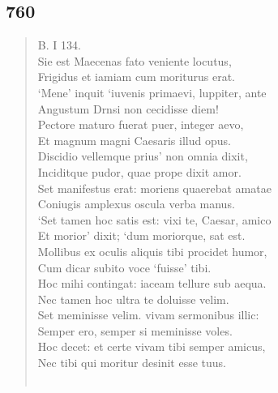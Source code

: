 \documentclass[11pt, a4paper]{report}
\begin{document}
            \subsection*{760}
      \begin{verse}
      B. I 134. \\ Sie est Maecenas fato veniente locutus, \\ Frigidus et iamiam cum moriturus erat. \\ ‘Mene’ inquit ‘iuvenis primaevi, luppiter, ante \\ Angustum Drnsi non cecidisse diem! \\ Pectore maturo fuerat puer, integer aevo, \\ Et magnum magni Caesaris illud opus. \\ Discidio vellemque prius’ non omnia dixit, \\ Inciditque pudor, quae prope dixit amor. \\ Set manifestus erat: moriens quaerebat amatae \\ Coniugis amplexus oscula verba manus. \\ ‘Set tamen hoc satis est: vixi te, Caesar, amico \\ Et morior’ dixit; ‘dum moriorque, sat est. \\ Mollibus ex oculis aliquis tibi procidet humor, \\ Cum dicar subito voce ‘fuisse’ tibi. \\ Hoc mihi contingat: iaceam tellure sub aequa. \\ Nec tamen hoc ultra te doluisse velim. \\ Set meminisse velim. vivam sermonibus illic: \\ Semper ero, semper si meminisse voles. \\ Hoc decet: et certe vivam tibi semper amicus, \\ Nec tibi qui moritur desinit esse tuus. \\ 
        ﻿\pagebreak 

\end{verse}
\end{document}
